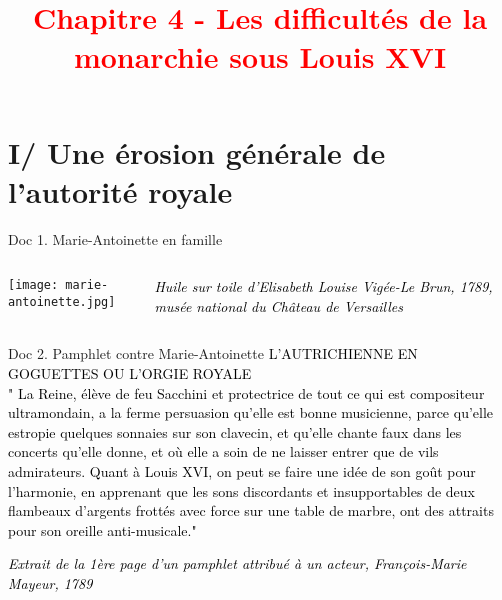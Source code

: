 \documentclass{beamer}
\title{{\textcolor{red}{Chapitre 4 - Les difficultés de la monarchie sous Louis XVI }}}
\begin{document}
 
\begin{frame}
\titlepage %
\end{frame}

\begin{frame}
\tableofcontents
\end{frame}

\section{I/ Une érosion générale de l'autorité royale}

\begin{frame}
\begin{beamerboxesrounded}[scheme=blocimage]{Doc 1. Marie-Antoinette en famille}
\begin{columns}[c]
\begin{column}{7 cm}
\texttt{[image: marie-antoinette.jpg]}
\end{column}

\begin{column}{3 cm}
\textcolor{black}{\small \textit{Huile sur toile d'Elisabeth Louise Vigée-Le Brun, 1789, musée	national du Château de Versailles}}
\end{column}
\end{columns}
\end{beamerboxesrounded}
\end{frame}

\begin{frame}
\begin{beamerboxesrounded}[scheme=blocimage]{Doc 2. Pamphlet contre Marie-Antoinette}
\textcolor{black}{L'AUTRICHIENNE EN GOGUETTES OU L'ORGIE ROYALE\\
" La Reine, élève de feu Sacchini et protectrice de tout ce qui est compositeur ultramondain, a la ferme persuasion qu'elle est bonne musicienne, parce qu'elle estropie quelques sonnaies sur son clavecin, et qu'elle chante faux dans les concerts qu'elle donne, et où elle a soin de ne laisser entrer que de vils admirateurs. Quant à Louis XVI, on peut se faire une idée de son goût pour l'harmonie, en apprenant que les sons discordants et insupportables de deux flambeaux d'argents frottés avec force sur une table de marbre, ont des attraits pour son oreille anti-musicale." }\\
\begin{flushright}
\textcolor{black}{\small \textit{Extrait de la 1ère page d'un pamphlet attribué à un acteur, François-Marie Mayeur, 1789}}
\end{flushright}
\end{beamerboxesrounded}
\end{frame}
\end{document}
